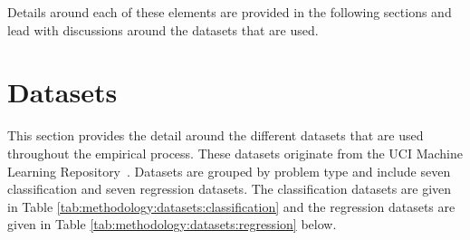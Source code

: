 Details around each of these elements are provided in the following sections and lead with discussions around the datasets that are used.

\section{Datasets}
\label{sec:methodology:datasets}

This section provides the detail around the different datasets that are used throughout the empirical process. These datasets originate from the UCI Machine Learning Repository~\cite{ref:uci:2022}. Datasets are grouped by problem type and include seven classification and seven regression datasets. The classification datasets are given in Table \ref{tab:methodology:datasets:classification} and the regression datasets are given in Table \ref{tab:methodology:datasets:regression} below.

